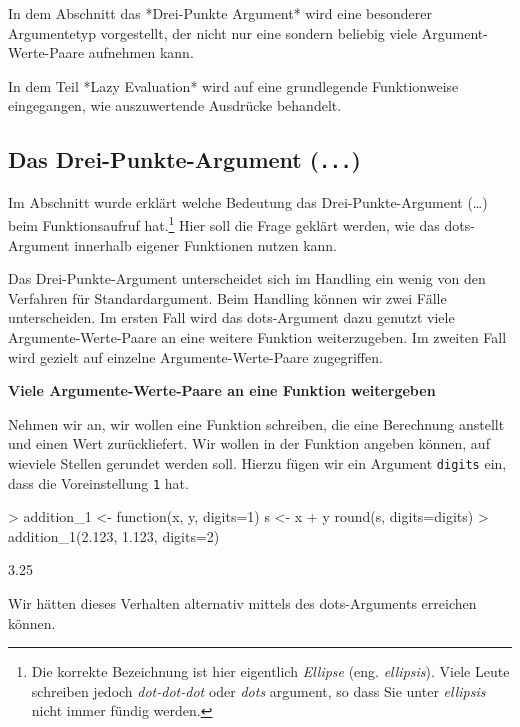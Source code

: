 \documentclass[12pt, a4paper,twoside,openany,x11names,svgnames]{memoir}
\begin{document}
In dem Abschnitt das *Drei-Punkte Argument* wird eine besonderer Argumentetyp vorgestellt, der nicht nur eine sondern beliebig viele Argument-Werte-Paare aufnehmen kann.

In dem Teil *Lazy Evaluation* wird auf eine grundlegende Funktionweise eingegangen, wie \R{} auszuwertende Ausdrücke behandelt.



\subsection{Das Drei-Punkte-Argument (\texttt{...})}

Im Abschnitt wurde erklärt welche Bedeutung das Drei-Punkte-Argument (\dots) beim Funktionsaufruf hat.\footnote{Die korrekte Bezeichnung ist hier eigentlich \emph{Ellipse} (eng. \emph{ellipsis}). Viele Leute schreiben jedoch \emph{dot-dot-dot} oder \emph{dots}  argument, so dass Sie unter \emph{ellipsis} nicht immer fündig werden.} Hier soll die Frage geklärt werden, wie das dots-Argument innerhalb eigener Funktionen nutzen kann.

Das Drei-Punkte-Argument unterscheidet sich im Handling ein wenig von den Verfahren für Standardargument. Beim Handling können wir zwei Fälle unterscheiden. 
Im ersten Fall wird das dots-Argument dazu genutzt viele Argumente-Werte-Paare an eine weitere Funktion weiterzugeben. Im zweiten Fall wird gezielt auf einzelne Argumente-Werte-Paare zugegriffen.

\vspace*{5mm}

\textbf{Viele Argumente-Werte-Paare an eine Funktion weitergeben}

Nehmen wir an, wir wollen eine Funktion schreiben, die eine Berechnung anstellt und einen Wert zurückliefert. Wir wollen in der Funktion angeben können, auf wieviele Stellen gerundet werden soll. Hierzu fügen wir ein Argument \texttt{digits} ein, dass die Voreinstellung \texttt{1} hat.

\begin{Schunk}
\begin{Sinput}
> addition_1 <- function(x, y, digits=1) {
   s <- x + y
   round(s, digits=digits)
 }
> addition_1(2.123, 1.123, digits=2)
\end{Sinput}
\begin{Soutput}
[1] 3.25
\end{Soutput}
\end{Schunk}

Wir hätten dieses Verhalten alternativ mittels des dots-Arguments erreichen können. 
\end{document}
